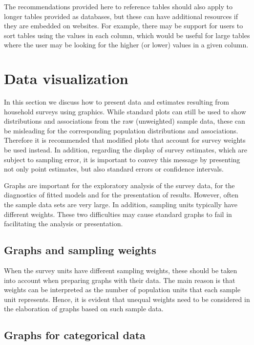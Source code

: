 \documentclass[
  12pt,
]{book}
\begin{document}
The recommendations provided here to reference tables should also apply to longer tables provided as databases, but these can have additional resources if they are embedded on websites. For example, there may be support for users to sort tables using the values in each column, which would be useful for large tables where the user may be looking for the higher (or lower) values in a given column.

\chapter{Data visualization}\label{data-visualization}

In this section we discuss how to present data and estimates resulting from household surveys using graphics. While standard plots can still be used to show distributions and associations from the raw (unweighted) sample data, these can be misleading for the corresponding population distributions and associations. Therefore it is recommended that modified plots that account for survey weights be used instead. In addition, regarding the display of survey estimates, which are subject to sampling error, it is important to convey this message by presenting not only point estimates, but also standard errors or confidence intervals.

Graphs are important for the exploratory analysis of the survey data, for the diagnostics of fitted models and for the presentation of results. However, often the sample data sets are very large. In addition, sampling units typically have different weights. These two difficulties may cause standard graphs to fail in facilitating the analysis or presentation.

\section{Graphs and sampling weights}\label{graphs-and-sampling-weights}

When the survey units have different sampling weights, these should be taken into account when preparing graphs with their data. The main reason is that weights can be interpreted as the number of population units that each sample unit represents. Hence, it is evident that unequal weights need to be considered in the elaboration of graphs based on such sample data.

\section{Graphs for categorical data}\label{graphs-for-categorical-data}
\end{document}
